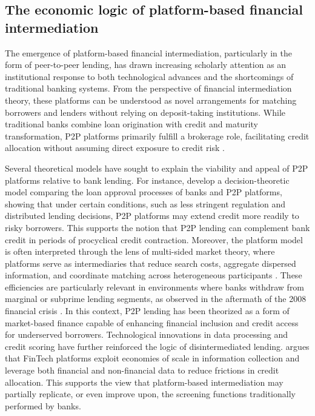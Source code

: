 \documentclass[pdflatex,sn-apa]{sn-jnl}%
\theoremstyle{thmstyleone}%
\theoremstyle{thmstyletwo}%
\theoremstyle{thmstylethree}%
\begin{document}
\subsection{The economic logic of platform-based financial intermediation}
The emergence of platform-based financial intermediation, particularly in the form of peer-to-peer lending, has drawn increasing scholarly attention as an institutional response to both technological advances and the shortcomings of traditional banking systems. From the perspective of financial intermediation theory, these platforms can be understood as novel arrangements for matching borrowers and lenders without relying on deposit-taking institutions. While traditional banks combine loan origination with credit and maturity transformation, P2P platforms primarily fulfill a brokerage role, facilitating credit allocation without assuming direct exposure to credit risk \citep{Havrylchyk2018115, Dömötör2021391}.

Several theoretical models have sought to explain the viability and appeal of P2P platforms relative to bank lending. For instance, \cite{Ben-Yashar2024939} develop a decision-theoretic model comparing the loan approval processes of banks and P2P platforms, showing that under certain conditions, such as less stringent regulation and distributed lending decisions, P2P platforms may extend credit more readily to risky borrowers. This supports the notion that P2P lending can complement bank credit in periods of procyclical credit contraction. Moreover, the platform model is often interpreted through the lens of multi-sided market theory, where platforms serve as intermediaries that reduce search costs, aggregate dispersed information, and coordinate matching across heterogeneous participants \citep{Berger200939}. These efficiencies are particularly relevant in environments where banks withdraw from marginal or subprime lending segments, as observed in the aftermath of the 2008 financial crisis \citep{Bavoso2020395}. In this context, P2P lending has been theorized as a form of market-based finance capable of enhancing financial inclusion and credit access for underserved borrowers. Technological innovations in data processing and credit scoring have further reinforced the logic of disintermediated lending. \cite{Georgiev2024587} argues that FinTech platforms exploit economies of scale in information collection and leverage both financial and non-financial data to reduce frictions in credit allocation. This supports the view that platform-based intermediation may partially replicate, or even improve upon, the screening functions traditionally performed by banks.
\end{document}
